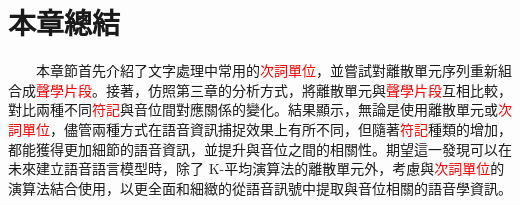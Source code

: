 \section{本章總結}

　　本章節首先介紹了文字處理中常用的\textcolor{red}{次詞單位}，並嘗試對離散單元序列重新組合成\textcolor{red}{聲學片段}。接著，仿照第三章的分析方式，將離散單元與\textcolor{red}{聲學片段}互相比較，對比兩種不同\textcolor{red}{符記}與音位間對應關係的變化。結果顯示，無論是使用離散單元或\textcolor{red}{次詞單位}，儘管兩種方式在語音資訊捕捉效果上有所不同，但隨著\textcolor{red}{符記}種類的增加，都能獲得更加細節的語音資訊，並提升與音位之間的相關性。期望這一發現可以在未來建立語音語言模型時，除了 K-平均演算法的離散單元外，考慮與\textcolor{red}{次詞單位}的演算法結合使用，以更全面和細緻的從語音訊號中提取與音位相關的語音學資訊。
